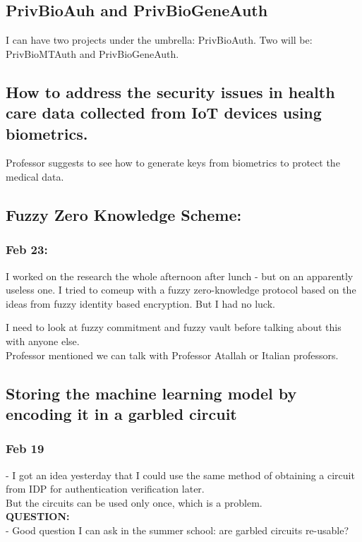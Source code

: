 \documentclass[11pt]{article}
\begin{document}
\subsection*{PrivBioAuh and PrivBioGeneAuth}
I can have two projects under the umbrella: PrivBioAuth. Two will be: PrivBioMTAuth and PrivBioGeneAuth.\\

\subsection*{How to address the security issues in health care data collected from IoT devices using biometrics.}
Professor suggests to see how to generate keys from biometrics to protect the medical data.

\subsection*{Fuzzy Zero Knowledge Scheme:}
\subsubsection*{Feb 23:}
I worked on the research the whole afternoon after lunch - but on an apparently useless one. I tried to comeup with a fuzzy zero-knowledge protocol 
based on the ideas from fuzzy identity based encryption. But I had no luck.

I need to look at fuzzy commitment and fuzzy vault before talking about this with anyone else.\\
Professor mentioned we can talk with Professor Atallah or Italian professors.\\

\subsection*{Storing the machine learning model by encoding it in a garbled circuit}
\subsubsection*{Feb 19}
- I got an idea yesterday that I could use the same method of obtaining a circuit from IDP for authentication verification later.\\ 
But the circuits can be used only once, which is a problem.\\
\textbf{QUESTION:}\\
- Good question I can ask in the summer school: are garbled circuits re-usable?\\
\end{document}
